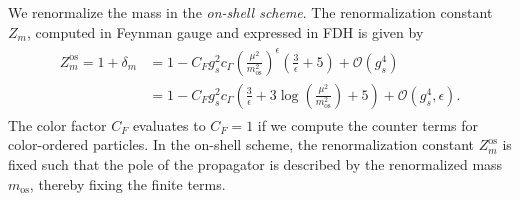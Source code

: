 We renormalize the mass in the \textit{on-shell scheme}. The renormalization
constant $Z_m$, computed in Feynman gauge and expressed in FDH is given by
\begin{align}\label{eq:rcm}
\begin{split}
  Z_m^{\text{os}}=1+\delta_m&=1-C_Fg_s^2c_\Gamma
  \left(\frac{\mu^2}{m_{\text{os}}^2}\right)^\epsilon
  \left(\frac{3}{\epsilon}+5\right)+\mathcal{O}(g_s^4)\\
&=1-C_Fg_s^2c_\Gamma \left(\frac{3}{\epsilon}+3\log{\left(\frac{\mu^2}{m_{\text{os}}^2}\right)}+5\right)+\mathcal{O}(g_s^4,\epsilon).
\end{split}
\end{align}
The color factor $C_F$ evaluates to $C_F=1$ if we compute the counter
terms for color-ordered particles. In the
on-shell scheme, the renormalization constant
$Z_m^{\text{os}}$ is fixed such that the pole of the
propagator is described by the renormalized mass
$m_{\text{os}}$, thereby fixing the finite terms. 





